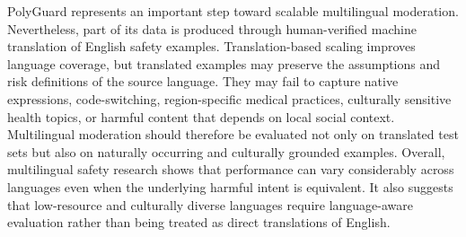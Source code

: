 \documentclass[11pt,a4paper]{article}
\begin{document}
PolyGuard represents an important step toward scalable multilingual moderation. Nevertheless, part of its data is produced through human-verified machine translation of English safety examples. Translation-based scaling improves language coverage, but translated examples may preserve the assumptions and risk definitions of the source language. They may fail to capture native expressions, code-switching, region-specific medical practices, culturally sensitive health topics, or harmful content that depends on local social context. Multilingual moderation should therefore be evaluated not only on translated test sets but also on naturally occurring and culturally grounded examples.
Overall, multilingual safety research shows that performance can vary considerably across languages even when the underlying harmful intent is equivalent. It also suggests that low-resource and culturally diverse languages require language-aware evaluation rather than being treated as direct translations of English.
\end{document}
